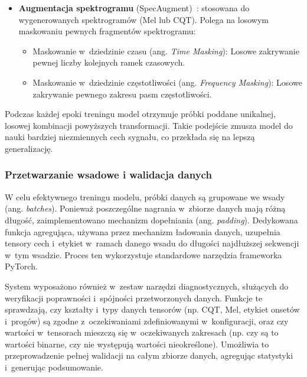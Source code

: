 \begin{itemize}
\begin{itemize}
        \item Symulacja przesterowania (ang. \textit{clipping}): W warunkach domowych łatwo jest ustawić zbyt wysoki poziom głośności nagrywania, co prowadzi do cyfrowego obcinania wierzchołków fali dźwiękowej. Aby przygotować model na takie sytuacje, wprowadzono augmentację, która celowo obcina amplitudę sygnału po przekroczeniu pewnego progu. Uczy to model rozpoznawania nut nawet wtedy, gdy ich sygnał jest zniekształcony w~ten sposób. Próg, przy którym następuje obcięcie, jest losowany, co naśladuje różne stopnie przesterowania sygnału.
    \end{itemize}
    \item \textbf{Augmentacja spektrogramu} (SpecAugment)~\autocite{Park2019SpecAugment}: stosowana do wygenerowanych spektrogramów (Mel lub CQT). Polega na losowym maskowaniu pewnych fragmentów spektrogramu:
    \begin{itemize}
        \item Maskowanie w~dziedzinie czasu (ang. \textit{Time Masking}): Losowe zakrywanie pewnej liczby kolejnych ramek czasowych.
        \item Maskowanie w~dziedzinie częstotliwości (ang. \textit{Frequency Masking}): Losowe zakrywanie pewnego zakresu pasm częstotliwości.
    \end{itemize}
\end{itemize}
Podczas każdej epoki treningu model otrzymuje próbki poddane unikalnej, losowej kombinacji powyższych transformacji. Takie podejście zmusza model do nauki bardziej niezmiennych cech sygnału, co przekłada się na lepszą generalizację.

\subsubsection{Przetwarzanie wsadowe i walidacja danych}
\label{sssec:przetwarzanie_wsadowe_walidacja}

W celu efektywnego treningu modelu, próbki danych są grupowane we wsady (ang. \textit{batches}). Ponieważ poszczególne nagrania w~zbiorze danych mają różną długość, zaimplementowano mechanizm dopełniania (ang. \textit{padding}). Dedykowana funkcja agregująca, używana przez mechanizm ładowania danych, uzupełnia tensory cech i~etykiet w~ramach danego wsadu do długości najdłuższej sekwencji w~tym wsadzie. Proces ten wykorzystuje standardowe narzędzia frameworka PyTorch.

System wyposażono również w~zestaw narzędzi diagnostycznych, służących do weryfikacji poprawności i~spójności przetworzonych danych. Funkcje te sprawdzają, czy kształty i~typy danych tensorów (np. CQT, Mel, etykiet onsetów i~progów) są zgodne z~oczekiwaniami zdefiniowanymi w~konfiguracji, oraz czy wartości w~tensorach mieszczą się w~oczekiwanych zakresach (np. czy są to wartości binarne, czy nie występują wartości nieokreślone). Umożliwia to przeprowadzenie pełnej walidacji na całym zbiorze danych, agregując statystyki i~generując podsumowanie.

